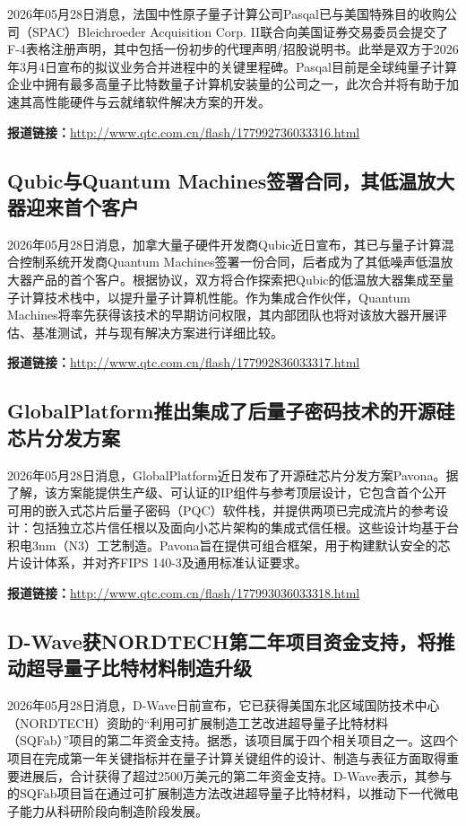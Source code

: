\documentclass[12pt,a4paper]{ctexart}
\begin{document}
2026年05月28日消息，法国中性原子量子计算公司Pasqal已与美国特殊目的收购公司（SPAC）Bleichroeder Acquisition Corp. II联合向美国证券交易委员会提交了F-4表格注册声明，其中包括一份初步的代理声明/招股说明书。此举是双方于2026年3月4日宣布的拟议业务合并进程中的关键里程碑。Pasqal目前是全球纯量子计算企业中拥有最多高量子比特数量子计算机安装量的公司之一，此次合并将有助于加速其高性能硬件与云就绪软件解决方案的开发。

\noindent\textbf{报道链接：}\url{http://www.qtc.com.cn/flash/177992736033316.html}

\subsection{ Qubic与Quantum Machines签署合同，其低温放大器迎来首个客户 }

2026年05月28日消息，加拿大量子硬件开发商Qubic近日宣布，其已与量子计算混合控制系统开发商Quantum Machines签署一份合同，后者成为了其低噪声低温放大器产品的首个客户。根据协议，双方将合作探索把Qubic的低温放大器集成至量子计算技术栈中，以提升量子计算机性能。作为集成合作伙伴，Quantum Machines将率先获得该技术的早期访问权限，其内部团队也将对该放大器开展评估、基准测试，并与现有解决方案进行详细比较。

\noindent\textbf{报道链接：}\url{http://www.qtc.com.cn/flash/177992836033317.html}

\subsection{ GlobalPlatform推出集成了后量子密码技术的开源硅芯片分发方案 }

2026年05月28日消息，GlobalPlatform近日发布了开源硅芯片分发方案Pavona。据了解，该方案能提供生产级、可认证的IP组件与参考顶层设计，它包含首个公开可用的嵌入式芯片后量子密码（PQC）软件栈，并提供两项已完成流片的参考设计：包括独立芯片信任根以及面向小芯片架构的集成式信任根。这些设计均基于台积电3nm（N3）工艺制造。Pavona旨在提供可组合框架，用于构建默认安全的芯片设计体系，并对齐FIPS 140-3及通用标准认证要求。

\noindent\textbf{报道链接：}\url{http://www.qtc.com.cn/flash/177993036033318.html}

\subsection{ D-Wave获NORDTECH第二年项目资金支持，将推动超导量子比特材料制造升级 }

2026年05月28日消息，D-Wave日前宣布，它已获得美国东北区域国防技术中心（NORDTECH）资助的“利用可扩展制造工艺改进超导量子比特材料（SQFab）”项目的第二年资金支持。据悉，该项目属于四个相关项目之一。这四个项目在完成第一年关键指标并在量子计算关键组件的设计、制造与表征方面取得重要进展后，合计获得了超过2500万美元的第二年资金支持。D-Wave表示，其参与的SQFab项目旨在通过可扩展制造方法改进超导量子比特材料，以推动下一代微电子能力从科研阶段向制造阶段发展。
\end{document}
